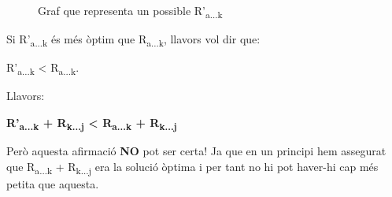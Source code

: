 \documentclass[12pt, letterpaper]{article}
\begin{document}
\begin{figure}[htbp]
\begin{center}
\caption{Graf que representa un possible R'\textsubscript{a...k}}
\label{demostracio:atoktojhypotetical}
\end{center}
\end{figure}

Si R'\textsubscript{a...k} és més òptim que R\textsubscript{a...k}, llavors vol dir que: \\
\begin{center}
R'\textsubscript{a...k} < R\textsubscript{a...k}.\\
\end{center}
Llavors:\\
\begin{center}
\textbf{R'\textsubscript{a...k} + R\textsubscript{k...j} < R\textsubscript{a...k} + R\textsubscript{k...j}} \\
\end{center}

Però aquesta afirmació \textbf{NO} pot ser certa! Ja que en un principi hem assegurat que R\textsubscript{a...k} + R\textsubscript{k...j} era la solució òptima i per tant no hi pot haver-hi cap més petita que aquesta.
\end{document}
